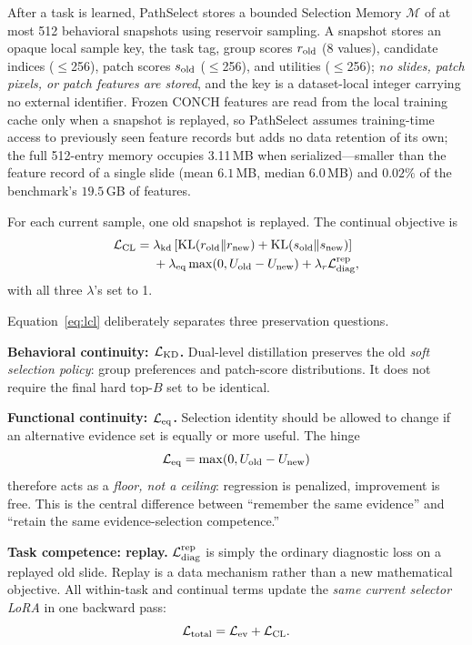 \documentclass{article}
\def\L{{\cal L}}
\newcommand{\Mem}{\mathcal{M}}
\begin{document}
After a task is learned, PathSelect stores a bounded Selection Memory
$\Mem$ of at most 512 behavioral snapshots using reservoir sampling.
A snapshot stores an opaque local sample key, the task tag, group scores $r_{\rm old}$ (8 values), candidate indices ($\le$256), patch scores $s_{\rm old}$ ($\le$256), and utilities ($\le$256); \emph{no slides, patch pixels, or patch features are stored}, and the key is a dataset-local integer carrying no external identifier. Frozen CONCH features are read from the local training cache only when a snapshot is replayed, so PathSelect assumes training-time access to previously seen feature records but adds no data retention of its own; the full 512-entry memory occupies 3.11\,MB when serialized---smaller than the feature record of a single slide (mean $6.1$\,MB, median $6.0$\,MB) and $0.02\%$ of the benchmark's $19.5$\,GB of features.

For each current sample, one old snapshot is replayed.
The continual objective is
\begin{align}
\L_{\mathrm{CL}}
={}&
\lambda_{\mathrm{kd}}
\left[
\mathrm{KL}(r_{\mathrm{old}}\Vert r_{\mathrm{new}})
+
\mathrm{KL}(s_{\mathrm{old}}\Vert s_{\mathrm{new}})
\right]
\nonumber\\
&+
\lambda_{\mathrm{eq}}
\max(0,U_{\mathrm{old}}-U_{\mathrm{new}})
+
\lambda_r \L_{\mathrm{diag}}^{\mathrm{rep}},
\label{eq:lcl}
\end{align}
with all three $\lambda$'s set to 1.

Equation~\ref{eq:lcl} deliberately separates three preservation questions.

\textbf{Behavioral continuity: $\L_{\rm KD}$.}
Dual-level distillation preserves the old \emph{soft selection policy}: group preferences and patch-score distributions.
It does not require the final hard top-$B$ set to be identical.

\textbf{Functional continuity: $\L_{\rm eq}$.}
Selection identity should be allowed to change if an alternative evidence set is equally or more useful.
The hinge
\[
\L_{\rm eq}=\max(0,U_{\rm old}-U_{\rm new})
\]
therefore acts as a \emph{floor, not a ceiling}: regression is penalized, improvement is free.
This is the central difference between ``remember the same evidence'' and ``retain the same evidence-selection competence.''

\textbf{Task competence: replay.}
$\L_{\mathrm{diag}}^{\mathrm{rep}}$ is simply the ordinary diagnostic loss on a replayed old slide.
Replay is a data mechanism rather than a new mathematical objective.
All within-task and continual terms update the \emph{same current selector LoRA} in one backward pass:
\[
\L_{\mathrm{total}}=\L_{\mathrm{ev}}+\L_{\mathrm{CL}}.
\]
\end{document}
